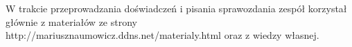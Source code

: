 \documentclass[polish,a4paper]{article}
\begin{document}


\begin{thebibliography}{9}

  W trakcie przeprowadzania doświadczeń i pisania sprawozdania zespół korzystał głównie z materiałów ze strony http://mariusznaumowicz.ddns.net/materialy.html oraz z wiedzy własnej.\\


\end{thebibliography}
\end{document}
